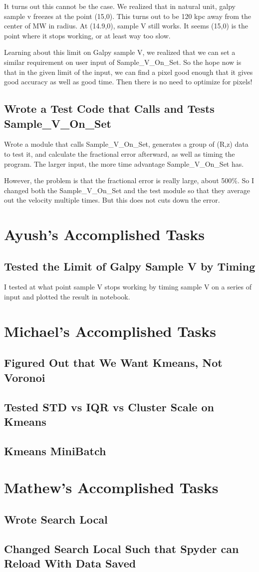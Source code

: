 \documentclass[12pt]{article}
\begin{document}
It turns out this cannot be the case. We realized that in natural unit, galpy sample v freezes at the point (15,0). This turns out to be 120 kpc away from the center of MW in radius. At (14.9,0), sample V still works. It seems (15,0) is the point where it stops working, or at least way too slow.

Learning about this limit on Galpy sample V, we realized that we can set a similar requirement on user input of Sample\_V\_On\_Set. So the hope now is that in the given limit of the input, we can find a pixel good enough that it gives good accuracy as well as good time. Then there is no need to optimize for pixels!

\subsection{Wrote a Test Code that Calls and Tests Sample\_V\_On\_Set}
Wrote a module that calls Sample\_V\_On\_Set, generates a group of (R,z) data to test it, and calculate the fractional error afterward, as well as timing the program. The larger input, the more time advantage Sample\_V\_On\_Set has.

However, the problem is that the fractional error is really large, about 500\%.
So I changed both the Sample\_V\_On\_Set and the test module so that they average out the velocity multiple times. But this does not cuts down the error.

\section{Ayush’s Accomplished Tasks}
\subsection{Tested the Limit of Galpy Sample V by Timing}
I tested at what point sample V stops working by timing sample V on a series of input and plotted the result in notebook.

\section{Michael's Accomplished Tasks}
\subsection{Figured Out that We Want Kmeans, Not Voronoi}
\subsection{Tested STD vs IQR vs Cluster Scale on Kmeans}
\subsection{Kmeans MiniBatch}

\section{Mathew's Accomplished Tasks}
\subsection{Wrote Search Local}
\subsection{Changed Search Local Such that Spyder can Reload With Data Saved}
\end{document}
